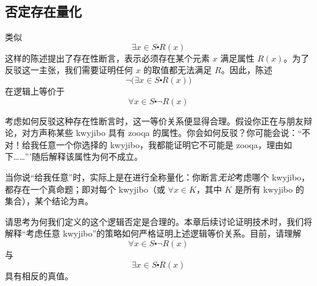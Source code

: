 \subsection{否定存在量化}

类似
\[\exists x \in S \centerdot R(x)\]
这样的陈述提出了存在性断言，表示必须存在某个元素 $x$ 满足属性 $R(x)$。为了反驳这一主张，我们需要证明任何 $x$ 的取值都无法满足 $R$。因此，陈述
\[\neg\big(\exists x \in S \centerdot R(x)\big)\]
在逻辑上等价于
\[\forall x \in S \centerdot \neg R(x)\]

考虑如何反驳这种存在性断言时，这一等价关系便显得合理。假设你正在与朋友辩论，对方声称某些 kwyjibo 具有 zooqa 的属性。你会如何反驳？你可能会说：``不对！给我任意一个你选择的 kwyjibo，我都能证明它不可能是 zooqa，理由如下……'''随后解释该属性为何不成立。

当你说``给我任意''时，实际上是在进行全称量化：你断言\emph{无论}考虑哪个 kwyjibo，都存在一个真命题；即对每个 kwyjibo（或 $\forall x \in K$，其中 $K$ 是所有 kwyjibo 的集合），某个结论为\verb|真|。

请思考为何我们定义的这个逻辑否定是合理的。本章后续讨论证明技术时，我们将解释``考虑{任意}  kwyjibo''的策略如何严格证明上述逻辑等价关系。目前，请理解
\[\forall x \in S \centerdot \neg R(x)\] 
与
\[\exists x \in S \centerdot R(x)\]
具有相反的真值。
